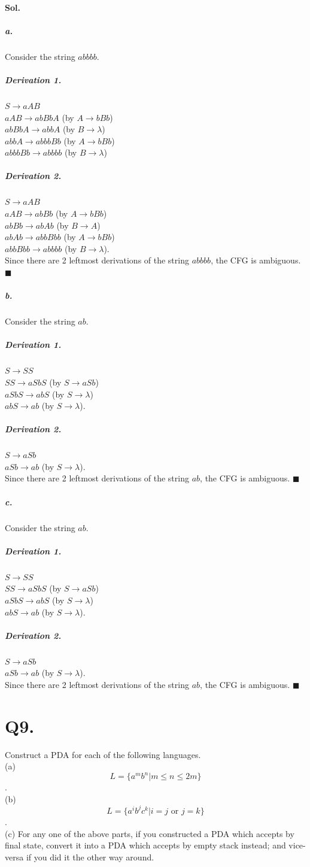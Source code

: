 \documentclass[]{article}
\begin{document}
	\paragraph{Sol.} 
	\subparagraph{a.} Consider the string $abbbb$.
	\subparagraph{Derivation 1.}
	$S \rightarrow aAB$ \\ $ aAB \rightarrow abBbA $ (by $A \rightarrow bBb$) \\ $abBbA \rightarrow abbA$ (by $B \rightarrow \lambda$) \\ $abbA \rightarrow abbbBb$ (by $A \rightarrow bBb$) \\ $abbbBb \rightarrow abbbb$ (by $B \rightarrow \lambda$)
	\subparagraph{Derivation 2.}
	$S \rightarrow aAB$ \\ $ aAB \rightarrow abBb $ (by $A \rightarrow bBb$) \\ $abBb \rightarrow abAb$ (by $B \rightarrow A$) \\ $abAb \rightarrow abbBbb$ (by $A \rightarrow bBb$) \\ $abbBbb \rightarrow abbbb$ (by $B \rightarrow \lambda$). \\
	Since there are 2 leftmost derivations of the string $abbbb$, the CFG is ambiguous. $\blacksquare$
	\subparagraph{b.} Consider the string $ab$.
	\subparagraph{Derivation 1.} 
	$ S \rightarrow SS$ \\ $ SS \rightarrow aSbS$ (by $S \rightarrow aSb$) \\ $ aSbS \rightarrow abS$ (by $S \rightarrow \lambda$) \\ $abS \rightarrow ab$ (by $S \rightarrow \lambda$).
	\subparagraph{Derivation 2.}
	$ S \rightarrow aSb $ \\ $ aSb \rightarrow ab $ (by $S \rightarrow \lambda$). \\
	Since there are 2 leftmost derivations of the string $ab$, the CFG is ambiguous. $\blacksquare$
	\subparagraph{c.} Consider the string $ab$.
	 \subparagraph{Derivation 1.} 
	 $ S \rightarrow SS$ \\ $ SS \rightarrow aSbS$ (by $S \rightarrow aSb$) \\ $ aSbS \rightarrow abS$ (by $S \rightarrow \lambda$) \\ $abS \rightarrow ab$ (by $S \rightarrow \lambda$).
	 \subparagraph{Derivation 2.}
	 $ S \rightarrow aSb $ \\ $ aSb \rightarrow ab $ (by $S \rightarrow \lambda$). \\
	Since there are 2 leftmost derivations of the string $ab$, the CFG is ambiguous. $\blacksquare$
	\pagebreak
	\section*{Q9.}
	Construct a PDA for each of the following languages. \\
	(a) $$ L = \{a^m b^n | m \leq n \leq 2m\}$$. \\
	(b) $$ L = \{a^i b^j c^k | i = j \text{ or } j = k\}$$. \\
	(c) For any one of the above parts, if you constructed a PDA which accepts by final state, convert it into a PDA which accepts by empty stack instead; and vice-versa if you did it the other way around.
\end{document}
